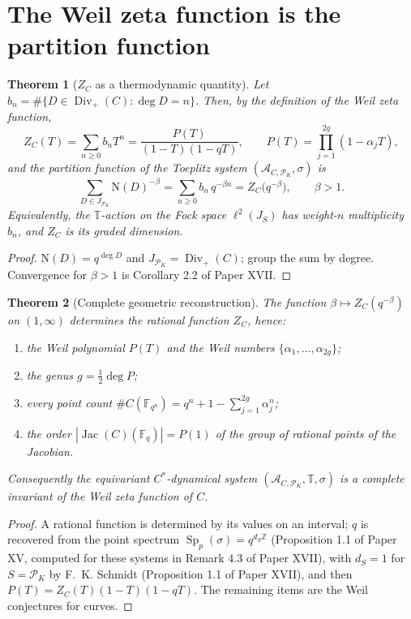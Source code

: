 \documentclass[11pt]{amsart}
\numberwithin{equation}{section}
\newtheorem{theorem}{Theorem}[section]
\theoremstyle{definition}
\theoremstyle{remark}
\newcommand{\Z}{\mathbb{Z}}
\newcommand{\F}{\mathbb{F}}
\newcommand{\T}{\mathbb{T}}
\newcommand{\cA}{\mathcal{A}}
\newcommand{\cP}{\mathcal{P}}
\newcommand{\Ns}{\mathrm{N}}
\newcommand{\Jac}{\operatorname{Jac}}
\newcommand{\Div}{\operatorname{Div}}
\newcommand{\Sp}{\operatorname{Sp}}
\begin{document}
\section{The Weil zeta function is the partition function}

\begin{theorem}[$Z_C$ as a thermodynamic quantity]\label{thm:partition}
Let $b_n=\#\{D\in\Div_+(C):\deg D=n\}$. Then, by the definition of the Weil zeta function,
\[
Z_C(T)=\sum_{n\ge0}b_nT^n=\frac{P(T)}{(1-T)(1-qT)},\qquad P(T)=\prod_{j=1}^{2g}(1-\alpha_jT),
\]
and the partition function of the Toeplitz system $(\cA_{C,\cP_K},\sigma)$ is
\begin{equation}\label{eq:partition}
\sum_{D\in J_{\cP_K}}\Ns(D)^{-\beta}=\sum_{n\ge0}b_n\,q^{-\beta n}=Z_C\bigl(q^{-\beta}\bigr),
\qquad\beta>1 .
\end{equation}
Equivalently, the $\T$-action on the Fock space $\ell^2(J_S)$ has weight-$n$ multiplicity
$b_n$, and $Z_C$ is its graded dimension.
\end{theorem}

\begin{proof}
$\Ns(D)=q^{\deg D}$ and $J_{\cP_K}=\Div_+(C)$; group the sum by degree. Convergence for
$\beta>1$ is Corollary 2.2 of Paper XVII.
\end{proof}

\begin{theorem}[Complete geometric reconstruction]\label{thm:reconstruct}
The function $\beta\mapsto Z_C(q^{-\beta})$ on $(1,\infty)$ determines the rational function
$Z_C$, hence:
\begin{enumerate}
\item the Weil polynomial $P(T)$ and the Weil numbers $\{\alpha_1,\dots,\alpha_{2g}\}$;
\item the genus $g=\tfrac12\deg P$;
\item every point count $\#C(\F_{q^n})=q^n+1-\sum_{j=1}^{2g}\alpha_j^n$;
\item the order $|\Jac(C)(\F_q)|=P(1)$ of the group of rational points of the Jacobian.
\end{enumerate}
Consequently the equivariant $C^*$-dynamical system $(\cA_{C,\cP_K},\T,\sigma)$ is a complete
invariant of the Weil zeta function of $C$.
\end{theorem}

\begin{proof}
A rational function is determined by its values on an interval; $q$ is recovered from the
point spectrum $\Sp_p(\sigma)=q^{d_S\Z}$ (Proposition 1.1 of Paper XV, computed for these
systems in Remark 4.3 of Paper XVII), with $d_S=1$ for $S=\cP_K$ by F.~K. Schmidt
(Proposition 1.1 of Paper XVII), and then
$P(T)=Z_C(T)(1-T)(1-qT)$. The remaining items are the Weil conjectures for curves.
\end{proof}
\end{document}
